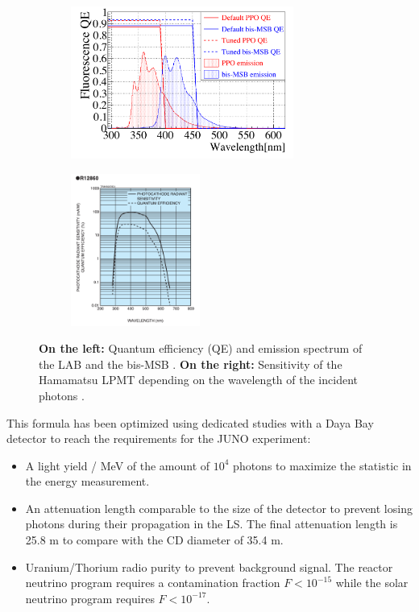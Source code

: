 \documentclass[../main.tex]{subfiles}
\begin{document}
\begin{figure}[ht]
  \centering
  \begin{subfigure}[b]{0.48\textwidth}
    \centering
    \includegraphics[height=5cm]{images/juno/LS_spectrum.png}
  \end{subfigure}
  \hfill
  \begin{subfigure}[b]{0.48\textwidth}
    \centering
    \includegraphics[height=5cm]{images/juno/LPMT_efficiency.png}
  \end{subfigure}
  \caption{\textbf{On the left:} Quantum efficiency (QE) and emission spectrum of the LAB and the bis-MSB \cite{bay_optimization_2020}. \textbf{On the right:} Sensitivity of the Hamamatsu LPMT depending on the wavelength of the incident photons \cite{noauthor_photomultiplier_nodate}.}
  \label{fig:juno:LS_spectrum_and_PMT_sensitivity}
\end{figure}

This formula has been optimized using dedicated studies with a Daya Bay detector \cite{bay_optimization_2020, zhang_complete_2020} to reach the requirements for the JUNO experiment:
\begin{itemize}
  \item A light yield / MeV of the amount of $10^4$ photons to maximize the statistic in the energy measurement.
  \item An attenuation length comparable to the size of the detector to prevent losing photons during their propagation in the LS. The final attenuation length is 25.8 m \cite{yang_light_2017} to compare with the CD diameter of 35.4 m.
  \item Uranium/Thorium radio purity to prevent background signal. The reactor neutrino program requires a contamination fraction $F<10^{-15}$ while the solar neutrino program requires $F<10^{-17}$.
\end{itemize}
\end{document}
